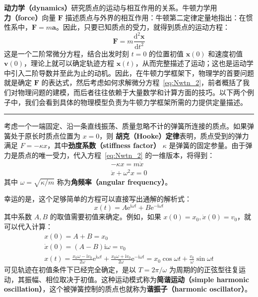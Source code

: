 \documentclass[cn,10pt,math=newtx,citestyle=gb7714-2015,bibstyle=gb7714-2015]{elegantbook}
\def\bm{\boldsymbol}
\def\d{\mathrm d}
\def\e{\mathrm e}
\def\i{\mathrm i}
\def\srule{\noindent\rule{\linewidth}{0.3mm}}
\begin{document}
\textbf{动力学（dynamics）}研究质点的运动与相互作用的关系。牛顿力学用\textbf{力（force）}向量 $\bm F$ 描述质点与外界的相互作用：牛顿第二定律定量地指出：在惯性系中，$\bm F=m\bm a$。因此，只要已知质点的受力，就得到质点的运动方程：
\begin{equation}\label{eq:Nwtn_2}
    \bm F = m\frac{\d^2 \bm x}{\d t^2}
\end{equation}
这是一个二阶常微分方程，结合出发时刻 $t=0$ 的位置初值 $\bm x(0)$ 和速度初值 $\bm v(0)$，理论上就可以确定轨迹方程 $\bm x(t)$，从而完整描述了运动；这也是运动学中引入二阶导数并至此为止的动机。因此，在牛顿力学框架下，物理学的首要问题就是确定 $\bm F$ 的表达式，然后考虑如何求解微分方程~\ref{eq:Nwtn_2}，前者概括了我们对物理问题的建模，而后者往往依赖于大量数学和计算方面的技巧。以下两个例子中，我们会看到具体的物理模型负责为牛顿力学框架所需的力提供定量描述。

\srule

\begin{instance}[谐振子]
考虑一个一端固定、沿一条直线振荡、质量忽略不计的弹簧所连接的质点。如果弹簧处于原长时质点位置为 $x=0$，则 \textbf{胡克（Hooke）定律}表明，质点受到的弹力满足 $F=-\kappa x$，其中\textbf{劲度系数（stiffness factor）} $\kappa$ 是弹簧的固定参量。由于弹力是质点的唯一受力，代入方程~\ref{eq:Nwtn_2} 的一维版本，将得到：
\begin{gather*}
-\kappa x = m\ddot{x}\nonumber\\
    \ddot{x} + \omega^2 x=0
\end{gather*}
其中 $\omega=\sqrt{\kappa/m}$ 称为\textbf{角频率（angular frequency）}。

幸运的是，这个足够简单的方程可以直接写出通解的解析式：
\begin{equation*}
    x(t) = A\e^{\i\omega t}+B\e^{-\i\omega t}
\end{equation*}
其中系数 $A,B$ 的取值需要初值来确定。例如，如果 $x(0)=x_0,\dot{x}(0)=v_0$，就可以代入计算：
\begin{gather}\label{eq:1hrmnc_oscltr}
    x(0) = A+B=x_0\nonumber\\
    \dot{x}(0) =(A-B)\i\omega = v_0\nonumber\\
    x(t)= \frac{x_0\omega-\i v_0}{2\omega}\e^{\i\omega t}+\frac{x_0\omega+\i v_0}{2\omega}\e^{-\i\omega t}=x_0\cos\omega t+\frac{v_0}{\omega}\sin{\omega t}
\end{gather}
可见轨迹在初值条件下已经完全确定，是以 $T=2\pi/\omega$ 为周期的的正弦型往复运动，其振幅、相位取决于初值。这种运动模式称为\textbf{简谐运动（simple harmonic oscillation）}，这个被弹簧控制的质点也就称为\textbf{谐振子（harmonic oscillator）}。
\end{instance}
\end{document}
